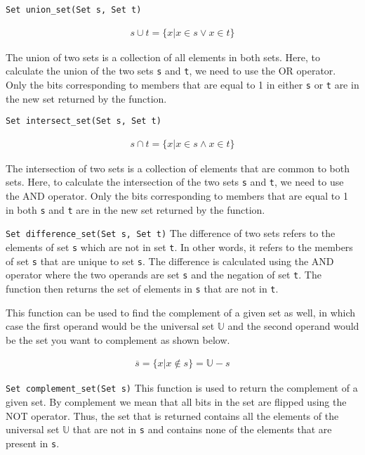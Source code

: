 \begin{funcdoc}{\texttt{Set union\_set(Set s, Set t)}}

\begin{align*}
  s \cup t = \{x | x \in s \lor x \in  t\}
\end{align*}

  \noindent The union of two sets is a collection of all elements in
  both sets. Here, to calculate the union of the two sets \texttt{s} and
  \texttt{t}, we need to use the OR operator. Only the bits
  corresponding to members that are equal to 1 in either \texttt{s} or
  \texttt{t} are in the new set returned by the function.
\end{funcdoc}

\begin{funcdoc}{\texttt{Set intersect\_set(Set s, Set t)}}

\begin{align*}
  s \cap t = \{x | x \in s \land x \in  t\}
\end{align*}

  \noindent The intersection of two sets is a collection of elements that
  are common to both sets. Here, to calculate the intersection of the
  two sets \texttt{s} and \texttt{t}, we need to use the AND operator.
  Only the bits corresponding to members that are equal to 1 in both
  \texttt{s} and \texttt{t} are in the new set returned by the function.
\end{funcdoc}

\begin{funcdoc}{\texttt{Set difference\_set(Set s, Set t)}}
  The difference of two sets refers to the elements of set \texttt{s}
  which are not in set \texttt{t}. In other words, it refers to the
  members of set \texttt{s} that are unique to set \texttt{s}. The
  difference is calculated using the AND operator where the two operands
  are set \texttt{s} and the negation of set \texttt{t}. The function
  then returns the set of elements in \texttt{s} that are not in
  \texttt{t}.

  This function can be used to find the complement of a given set as well,
  in which case the first operand would be the universal set $\mathbb{U}$
  and the second operand would be the set you want to complement as shown
  below.
\end{funcdoc}

\begin{align*}
  \overline{s} = \{ x | x \notin s\} = \mathbb{U} -s
\end{align*}

\begin{funcdoc}{\texttt{Set complement\_set(Set s)}}
  This function is used to return the complement of a given set. By
  complement we mean that all bits in the set are flipped using the NOT
  operator. Thus, the set that is returned contains all the elements of
  the universal set $\mathbb{U}$ that are not in \texttt{s} and contains
  none of the elements that are present in \texttt{s}.
\end{funcdoc}
